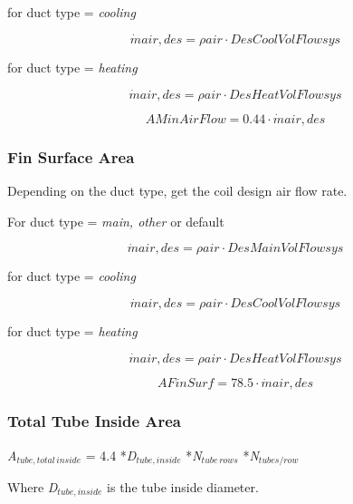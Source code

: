 for duct type = \emph{cooling}

\begin{equation}
\dot mair,des = \rho air\cdot DesCoolVolFlowsys
\end{equation}

for duct type = \emph{heating}

\begin{equation}
\dot mair,des = \rho air\cdot DesHeatVolFlowsys
\end{equation}

\begin{equation}
AMinAirFlow = 0.44\cdot \dot mair,des
\end{equation}

\subsubsection{Fin Surface Area}\label{fin-surface-area}

Depending on the duct type, get the coil design air flow rate.

For duct type = \emph{main, other} or default

\begin{equation}
\dot mair,des = \rho air\cdot DesMainVolFlowsys
\end{equation}

for duct type = \emph{cooling}

\begin{equation}
\dot mair,des = \rho air\cdot DesCoolVolFlowsys
\end{equation}

for duct type = \emph{heating}

\begin{equation}
\dot mair,des = \rho air\cdot DesHeatVolFlowsys
\end{equation}

\begin{equation}
AFinSurf = 78.5\cdot \dot mair,des
\end{equation}

\subsubsection{Total Tube Inside Area}\label{total-tube-inside-area}

\emph{A\(_{tube,total\, inside}\)} = 4.4 *\emph{D\(_{tube,inside}\)} *\emph{N\(_{tube\, rows}\)} *\emph{N\(_{tubes/row}\)}

Where \emph{D\(_{tube,inside}\)} is the tube inside diameter.

